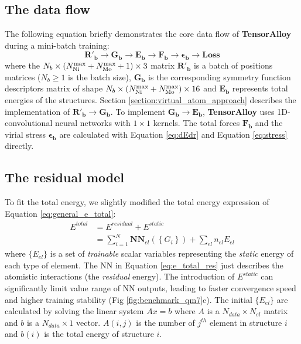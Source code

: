 \documentclass[preprint]{revtex4-2}
\begin{document}
\subsection{The data flow}

The following equation briefly demonstrates the core data flow of 
\textbf{TensorAlloy} during a mini-batch training: 
\begin{equation}
    \mathbf{R'_{b}} \rightarrow 
    \mathbf{G_b} \rightarrow 
    \mathbf{E_b} \rightarrow
    \mathbf{F_b} \rightarrow 
    \mathbf{\epsilon_b} \rightarrow
    \mathbf{Loss}
\end{equation}
where the $N_{b} \times (N_{\mathrm{Ni}}^{\mathrm{max}}+N_{\mathrm{Mo}}^{\mathrm{max}} + 1) \times 3$ matrix $\mathbf{R'_b}$ is a batch 
of positions matrices ($N_b \ge 1$ is the batch size), $\mathbf{G_b}$ is the 
corresponding symmetry function descriptors matrix of shape 
$N_{b} \times (N_{\mathrm{Ni}}^{\mathrm{max}}+N_{\mathrm{Mo}}^{\mathrm{max}}) \times 16$ and $\mathbf{E_b}$ represents 
total energies of the structures. Section \ref{section:virtual_atom_approach} 
describes the implementation of $\mathbf{R'_{b}} \rightarrow \mathbf{G_b}$. 
To implement $\mathbf{G_b} \rightarrow \mathbf{E_b}$, \textbf{TensorAlloy} uses 
1D-convolutional neural networks with $1 \times 1$ kernels\cite{kCON}. The total 
forces $\mathbf{F_{b}}$ and the virial stress $\mathbf{\epsilon_{b}}$ are 
calculated with Equation \ref{eq:dEdr} and Equation \ref{eq:stress} directly.

\subsection{The residual model}

To fit the total energy, we slightly modified the total energy expression of 
Equation \ref{eq:general_e_total}:
\begin{align}
\label{eq:e_total_res}
E^{total} & = E^{residual} + E^{static} \nonumber \\
& = \sum_{i=1}^{N}{
    \mathbf{NN}_{el}\left( \left\{ G_i \right\} \right)
} + \sum_{el}{n_{el}E_{el}}
\end{align}
where $\{E_{el}\}$ is a set of \textit{trainable} scalar variables representing 
the \textit{static} energy of each type of element\cite{kCON}. The NN in 
Equation \ref{eq:e_total_res} just describes the atomistic interactions 
(the \textit{residual} energy). The 
introduction of $E^{static}$ can significantly limit value range of NN outputs, 
leading to faster convergence speed and higher training stability 
(Fig \ref{fig:benchmark_qm7}c). The initial $\{E_{el}\}$ are calculated by 
solving the linear system $Ax=b$ where $A$ is a $N_{data} \times N_{el}$ matrix 
and $b$ is a $N_{data}\times 1$ vector. $A(i,j)$ is the number of $j^{th}$
element in structure $i$ and $b(i)$ is the total energy of structure $i$.
\end{document}
